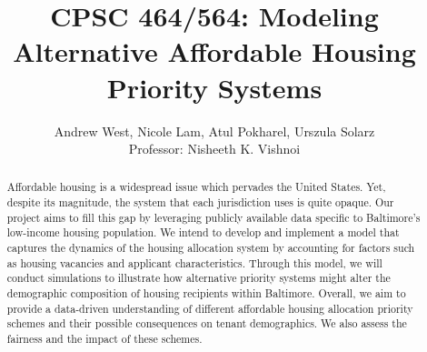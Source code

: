 \documentclass[11pt]{article}
\title{\bf CPSC 464/564: Modeling Alternative Affordable Housing Priority Systems}
\author{Andrew West, Nicole Lam, Atul Pokharel, Urszula Solarz \\
Professor: Nisheeth K. Vishnoi
}
\begin{document}
\maketitle
 
\begin{abstract}
Affordable housing is a widespread issue which pervades the United States. Yet, despite its magnitude, the system that each jurisdiction uses is quite opaque. Our project aims to fill this gap by leveraging publicly available data specific to Baltimore's low-income housing population. We intend to develop and implement a model that captures the dynamics of the housing allocation system by accounting for factors such as housing vacancies and applicant characteristics. Through this model, we will conduct simulations to illustrate how alternative priority systems might alter the demographic composition of housing recipients within Baltimore. Overall, we aim to provide a data-driven understanding of different affordable housing allocation priority schemes and their possible consequences on tenant demographics. We also assess the fairness and the impact of these schemes.
\end{abstract}


\newpage



\tableofcontents

\newpage
\end{document}
